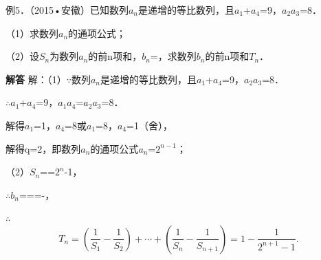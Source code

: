 例5．（2015•安徽）已知数列{\ensuremath{a_{n}}}是递增的等比数列，且\ensuremath{a_{1}}+\ensuremath{a_{4}}=9，\ensuremath{a_{2}}\ensuremath{a_{3}}=8．\par
（1）求数列{\ensuremath{a_{n}}}的通项公式；\par
（2）设\ensuremath{S_{n}}为数列{\ensuremath{a_{n}}}的前n项和，\ensuremath{b_{n}}=，求数列{\ensuremath{b_{n}}}的前n项和\ensuremath{T_{n}}．\par
\QuestionSpace{4.8cm}
\ifshowanswers
\par\begingroup\color{solutioncolor}\noindent\textbf{解答}\quad
解：（1）\ensuremath{\because}数列{\ensuremath{a_{n}}}是递增的等比数列，且\ensuremath{a_{1}}+\ensuremath{a_{4}}=9，\ensuremath{a_{2}}\ensuremath{a_{3}}=8．\par
\ensuremath{\therefore}\ensuremath{a_{1}}+\ensuremath{a_{4}}=9，\ensuremath{a_{1}}\ensuremath{a_{4}}=\ensuremath{a_{2}}\ensuremath{a_{3}}=8．\par
解得\ensuremath{a_{1}}=1，\ensuremath{a_{4}}=8或\ensuremath{a_{1}}=8，\ensuremath{a_{4}}=1（舍），\par
解得q=2，即数列{\ensuremath{a_{n}}}的通项公式\ensuremath{a_{n}}=\ensuremath{2^{n-1}}；\par
（2）\ensuremath{S_{n}}==\ensuremath{2^{n}}-1，\par
\ensuremath{\therefore}\ensuremath{b_{n}}===-，\par
\ensuremath{\therefore}
\[
T_n=\left(\frac1{S_1}-\frac1{S_2}\right)+\cdots+
\left(\frac1{S_n}-\frac1{S_{n+1}}\right)
=1-\frac1{2^{n+1}-1}.
\]
\par\endgroup\fi

